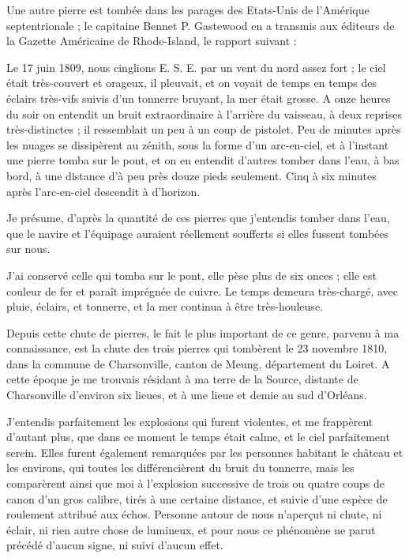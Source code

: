 \documentclass[a4paper, 12pt, oneside, french]{article}
\begin{document}
Une autre pierre est tombée dans les parages des Etats-Unis de l'Amérique septentrionale ; le capitaine Bennet P. Gastewood en a transmis aux éditeurs de la Gazette Américaine de Rhode-Island, le rapport suivant :

\og Le 17 juin 1809, nous cinglions E. S. E. par un vent du nord assez fort ; le ciel était très-couvert et orageux, il pleuvait, et on voyait de temps en temps des éclairs très-vifs suivis d'un tonnerre bruyant, la mer était grosse. A onze heures du soir on entendit un bruit extraordinaire à l'arrière du vaisseau, à deux reprises très-distinctes ; il ressemblait un peu à un coup de pistolet. Peu de minutes après les nuages se dissipèrent au zénith, sous la forme d'un arc-en-ciel, et à l'instant une pierre tomba sur le pont, et on en entendit d'autres tomber dans l'eau, à bas bord, à une distance d'à peu près douze pieds seulement. Cinq à six minutes après l'arc-en-ciel descendit à d'horizon. \fg

\og Je présume, d'après la quantité de ces pierres que j'entendis tomber dans l'eau, que le navire et l'équipage auraient réellement soufferts si elles fussent tombées sur nous. \fg

\og J'ai conservé celle qui tomba sur le pont, elle pèse plus de six onces ; elle est couleur de fer et paraît imprégnée de cuivre. Le temps demeura très-chargé, avec pluie, éclairs, et tonnerre, et la mer continua à être très-houleuse. \fg

Depuis cette chute de pierres, le fait le plus important de ce genre, parvenu à ma connaissance, est la chute des trois pierres qui tombèrent le 23 novembre 1810, dans la commune de Charsonville, canton de Meung, département du Loiret. A cette époque je me trouvais résidant à ma terre de la Source, distante de Charsonville d'environ six lieues, et à une lieue et demie au sud d'Orléans.

J'entendis parfaitement les explosions qui furent violentes, et me frappèrent d'autant plus, que dans ce moment le temps était calme, et le ciel parfaitement serein. Elles furent également remarquées par les personnes habitant le château et les environs, qui toutes les différencièrent du bruit du tonnerre, mais les comparèrent ainsi que moi à l'explosion successive de trois ou quatre coups de canon d'un gros calibre, tirés à une certaine distance, et suivie d'une espèce de roulement attribué aux échos. Personne autour de nous n'aperçut ni chute, ni éclair, ni rien autre chose de lumineux, et pour nous ce phénomène ne parut précédé d'aucun signe, ni suivi d'aucun effet.
\end{document}
